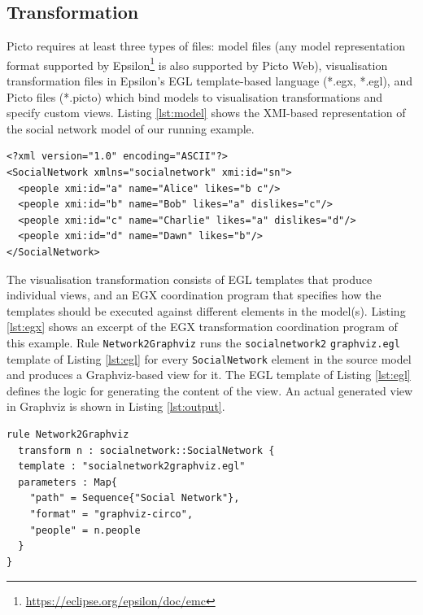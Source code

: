 \documentclass[sigconf,review]{acmart}
\begin{document}
\subsection{Transformation}
\label{sec:transformation}

Picto requires at least three types of files: model files (any model representation format supported by Epsilon\footnote{\url{https://eclipse.org/epsilon/doc/emc}} is also supported by Picto Web), visualisation transformation files in Epsilon's EGL template-based language (*.egx, *.egl), and Picto files (*.picto) which bind models to visualisation transformations and specify custom views. Listing \ref{lst:model} shows the XMI-based representation of the social network model of our running example. 

\begin{lstlisting}[firstnumber=1,style=model,caption={An a social network model as the input file for the lazy transformation. The format of the ids is simplified.},label=lst:model,float]
<?xml version="1.0" encoding="ASCII"?>
<SocialNetwork xmlns="socialnetwork" xmi:id="sn">
  <people xmi:id="a" name="Alice" likes="b c"/>
  <people xmi:id="b" name="Bob" likes="a" dislikes="c"/>
  <people xmi:id="c" name="Charlie" likes="a" dislikes="d"/>
  <people xmi:id="d" name="Dawn" likes="b"/>
</SocialNetwork>
\end{lstlisting}

The visualisation transformation consists of EGL templates that produce individual views, and an EGX coordination program that specifies how the templates should be executed against different elements in the model(s). Listing \ref{lst:egx} shows an excerpt of the EGX transformation coordination program of this example. Rule \texttt{Network2Graphviz} runs the \texttt{socialnetwork2} \texttt{graphviz.egl} template of Listing \ref{lst:egl} for every \texttt{SocialNetwork} element in the source model and produces a Graphviz-based view for it. The EGL template of Listing \ref{lst:egl} defines the logic for generating the content of the view. An actual generated view in Graphviz is shown in Listing \ref{lst:output}. 

\begin{lstlisting}[firstnumber=1,style=egx,caption={The Network2Graphviz EGX rule},label=lst:egx,float]
rule Network2Graphviz 
  transform n : socialnetwork::SocialNetwork {
  template : "socialnetwork2graphviz.egl"
  parameters : Map{
    "path" = Sequence{"Social Network"},
    "format" = "graphviz-circo",
    "people" = n.people
  }
}
\end{lstlisting}
\end{document}
